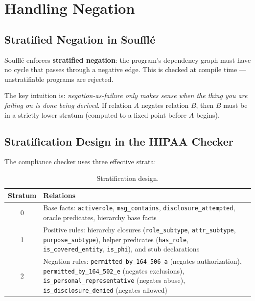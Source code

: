 \documentclass[11pt,letterpaper]{article}
\begin{document}
\section{Handling Negation}
\label{sec:negation}

\subsection{Stratified Negation in Souffl\'{e}}

Souffl\'{e} enforces \textbf{stratified negation}: the program's dependency graph must have no cycle that passes through a negative edge. This is checked at compile time --- unstratifiable programs are rejected.

The key intuition is: \emph{negation-as-failure only makes sense when the thing you are failing on is done being derived}. If relation $A$ negates relation $B$, then $B$ must be in a strictly lower stratum (computed to a fixed point before $A$ begins).

\subsection{Stratification Design in the HIPAA Checker}

The compliance checker uses three effective strata:

\begin{table}[H]
\centering
\begin{tabularx}{\textwidth}{cX}
\toprule
\textbf{Stratum} & \textbf{Relations} \\
\midrule
0 & Base facts: \texttt{activerole}, \texttt{msg\_contains}, \texttt{disclosure\_attempted}, oracle predicates, hierarchy base facts \\
1 & Positive rules: hierarchy closures (\texttt{role\_subtype}, \texttt{attr\_subtype}, \texttt{purpose\_subtype}), helper predicates (\texttt{has\_role}, \texttt{is\_covered\_entity}, \texttt{is\_phi}), and stub declarations \\
2 & Negation rules: \texttt{permitted\_by\_164\_506\_a} (negates authorization), \texttt{permitted\_by\_164\_502\_e} (negates exclusions), \texttt{is\_personal\_representative} (negates abuse), \texttt{is\_disclosure\_denied} (negates allowed) \\
\bottomrule
\end{tabularx}
\caption{Stratification design.}
\end{table}
\end{document}
